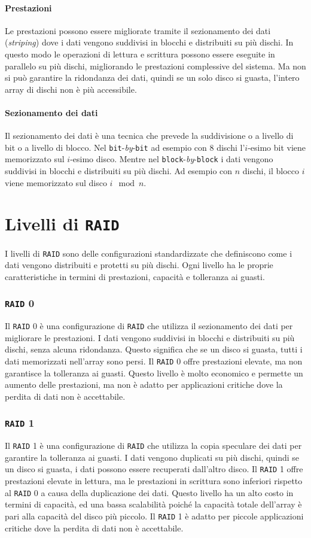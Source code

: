     \paragraph{Prestazioni} Le prestazioni possono essere migliorate tramite il sezionamento dei dati (\textit{striping}) dove i dati vengono suddivisi in blocchi e distribuiti su più dischi. In questo modo le operazioni di lettura e scrittura possono essere eseguite in parallelo su più dischi, migliorando le prestazioni complessive del sistema. Ma non si può garantire la ridondanza dei dati, quindi se un solo disco si guasta, l'intero array di dischi non è più accessibile.
    \paragraph{Sezionamento dei dati} Il sezionamento dei dati è una tecnica che prevede la suddivisione o a livello di bit o a livello di blocco. Nel \texttt{bit}-\textit{by}-\texttt{bit} ad esempio con 8 dischi l'$i$-esimo bit viene memorizzato sul $i$-esimo disco.  Mentre nel \texttt{block}-\textit{by}-\texttt{block} i dati vengono suddivisi in blocchi e distribuiti su più dischi. Ad esempio con $n$ dischi, il blocco $i$ viene memorizzato sul disco $i \mod n$. 
\section{Livelli di \texttt{RAID}}
    I livelli di \texttt{RAID} sono delle configurazioni standardizzate che definiscono come i dati vengono distribuiti e protetti su più dischi. Ogni livello ha le proprie caratteristiche in termini di prestazioni, capacità e tolleranza ai guasti.
    \subsubsection{\texttt{RAID} 0}
        Il \texttt{RAID} 0 è una configurazione di \texttt{RAID} che utilizza il sezionamento dei dati per migliorare le prestazioni. I dati vengono suddivisi in blocchi e distribuiti su più dischi, senza alcuna ridondanza. Questo significa che se un disco si guasta, tutti i dati memorizzati nell'array sono persi. Il \texttt{RAID} 0 offre prestazioni elevate, ma non garantisce la tolleranza ai guasti. Questo livello è molto economico e permette un aumento delle prestazioni, ma non è adatto per applicazioni critiche dove la perdita di dati non è accettabile.
    \subsubsection{\texttt{RAID} 1}
        Il \texttt{RAID} 1 è una configurazione di \texttt{RAID} che utilizza la copia speculare dei dati per garantire la tolleranza ai guasti. I dati vengono duplicati su più dischi, quindi se un disco si guasta, i dati possono essere recuperati dall'altro disco. Il \texttt{RAID} 1 offre prestazioni elevate in lettura, ma le prestazioni in scrittura sono inferiori rispetto al \texttt{RAID} 0 a causa della duplicazione dei dati. Questo livello ha un alto costo in termini di capacità, ed una bassa scalabilità poiché la capacità totale dell'array è pari alla capacità del disco più piccolo. Il \texttt{RAID} 1 è adatto per piccole applicazioni critiche dove la perdita di dati non è accettabile.
